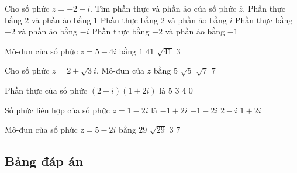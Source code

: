 \begin{ex}%
	Cho số phức $z=-2+i$. Tìm phần thực và phần ảo của số phức $\overline{z}$.
	\choice
	{Phần thực bằng $2$ và phần ảo bằng $1$}
	{Phần thực bằng $2$ và phần ảo bằng $i$}
	{Phần thực bằng $-2$ và phần ảo bằng $-i$}
	{\True Phần thực bằng $-2$ và phần ảo bằng $-1$}
\end{ex}
\begin{ex}%
	Mô-đun của số phức $z=5-4i$ bằng
	\choice
	{$1$}
	{$41$}
	{\True $\sqrt{41}$}
	{$3$}
\end{ex}
\begin{ex}%
	Cho số phức $z=2+\sqrt{3}i$. Mô-đun của $z$ bằng
	\choice
	{$5$}
	{$\sqrt{5}$}
	{\True $\sqrt{7}$}
	{$7$}
\end{ex}
\begin{ex}%
	Phần thực của số phức $(2-i)(1+2i)$ là
	\choice
	{$5$}
	{$3$}
	{\True $4$}
	{$0$}
\end{ex}
\begin{ex}%
	Số phức liên hợp của số phức $z=1-2i$ là
	\choice
	{$-1+2i$}
	{$-1-2i$}
	{$2-i$}
	{\True $1+2i$}
\end{ex}
\begin{ex}%
	Mô-đun của số phức $\mathrm{z}=5-2i$ bằng
	\choice
	{$29$}
	{\True $\sqrt{29}$}
	{$3$}
	{$7$}
\end{ex}

\subsection{Bảng đáp án}


